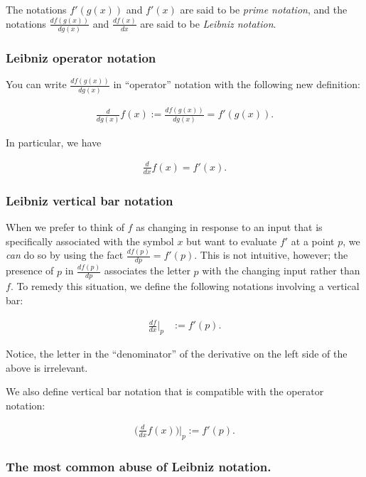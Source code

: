 The notations $f'(g(x))$ and $f'(x)$ are said to be \textit{prime notation}, and the notations $\frac{df(g(x))}{dg(x)}$ and $\frac{df(x)}{dx}$ are said to be \textit{Leibniz notation}.

\subsubsection*{Leibniz operator notation}
         
You can write $\frac{df(g(x))}{dg(x)}$ in ``operator'' notation with the following new definition:

\begin{align*}
    \frac{d}{dg(x)}f(x) := \frac{df(g(x))}{dg(x)} = f'(g(x)).
\end{align*}

In particular, we have

\begin{align*}
    \frac{d}{dx}f(x) = f'(x).
\end{align*}

\subsubsection*{Leibniz vertical bar notation}

When we prefer to think of $f$ as changing in response to an input that is specifically associated with the symbol $x$ but want to evaluate $f'$ at a point $p$, we \textit{can} do so by using the fact $\frac{df(p)}{dp} = f'(p)$. This is not intuitive, however; the presence of $p$ in $\frac{df(p)}{dp}$ associates the letter $p$ with the changing input rather than $f$. To remedy this situation, we define the following notations involving a vertical bar:

\begin{align*}
    \frac{df}{dx}\Big|_p &:= f'(p).
\end{align*}

Notice, the letter in the ``denominator'' of the derivative on the left side of the above is irrelevant. 

We also define vertical bar notation that is compatible with the operator notation:

\begin{align*}
    \Big(\frac{d}{dx}f(x)\Big)\Big|_p := f'(p).
\end{align*}

\subsubsection*{The most common abuse of Leibniz notation.}


